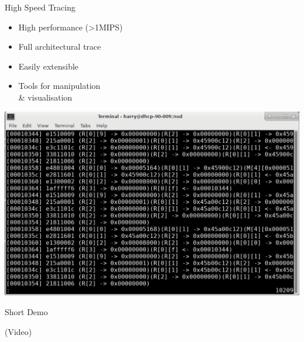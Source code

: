 \begin{frame}{High Speed Tracing}

\begin{minipage}[h]{0.45\textwidth}
\begin{itemize}
	\item High performance (>1MIPS)
	\item Full architectural trace
	\item Easily extensible
	\item Tools for manipulation \\\& visualisation
\end{itemize}
\end{minipage} %
\begin{minipage}[h]{0.45\textwidth}
\centering
\includegraphics[width=\textwidth]{figures/trace}
\end{minipage}

\end{frame}

\begin{frame}{Short Demo}

(Video)

\end{frame}
